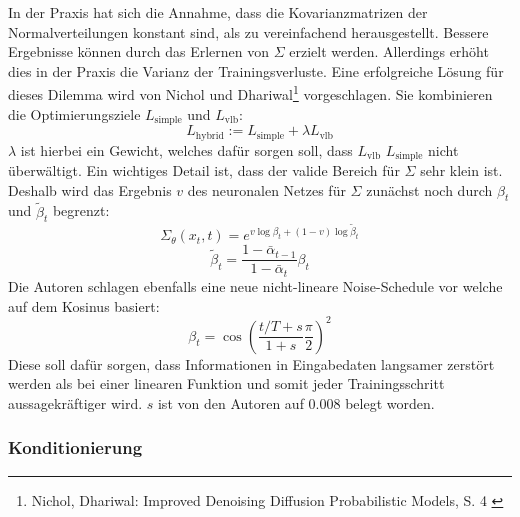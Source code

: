 In der Praxis hat sich die Annahme, dass die Kovarianzmatrizen der Normalverteilungen konstant sind, als zu vereinfachend herausgestellt. Bessere Ergebnisse können durch das Erlernen von $\Sigma$ erzielt werden. Allerdings erhöht dies in der Praxis die Varianz der Trainingsverluste. Eine erfolgreiche Lösung für dieses Dilemma wird von Nichol und Dhariwal\footnote{
    Nichol, Dhariwal: Improved Denoising Diffusion Probabilistic Models, S. 4
    \cite{nichol2021improveddenoisingdiffusionprobabilistic}
} vorgeschlagen. Sie kombinieren die Optimierungsziele $L_\text{simple}$ und $L_\text{vlb}$:
\begin{equation}
    L_\text{hybrid} := L_\text{simple} + \lambda L_\text{vlb}
\end{equation}
$\lambda$ ist hierbei ein Gewicht, welches dafür sorgen soll, dass $L_\text{vlb}$ $L_\text{simple}$ nicht überwältigt. Ein wichtiges Detail ist, dass der valide Bereich für $\Sigma$ sehr klein ist. Deshalb wird das Ergebnis $v$ des neuronalen Netzes für $\Sigma$ zunächst noch durch $\beta_t$ und $\tilde \beta_t$ begrenzt:
\begin{equation}
    \Sigma_\theta(x_t, t) = e^{v \log \beta_t + (1 - v) \log \tilde \beta_t}
\end{equation}
\begin{equation}
    \tilde \beta_t = \frac{1-\bar \alpha_{t-1}} {1-\bar \alpha_{t}} \beta_t
\end{equation}
Die Autoren schlagen ebenfalls eine neue nicht-lineare Noise-Schedule vor welche auf dem Kosinus basiert: 
\begin{equation}
    \beta_t = \cos \left ( 
        \frac{t/T+s}{1+s} \frac{\pi}{2}
    \right )^2
\end{equation}
Diese soll dafür sorgen, dass Informationen in Eingabedaten langsamer zerstört werden als bei einer linearen Funktion und somit jeder Trainingsschritt aussagekräftiger wird. $s$ ist von den Autoren auf 0.008 belegt worden.

\subsubsection{Konditionierung}

